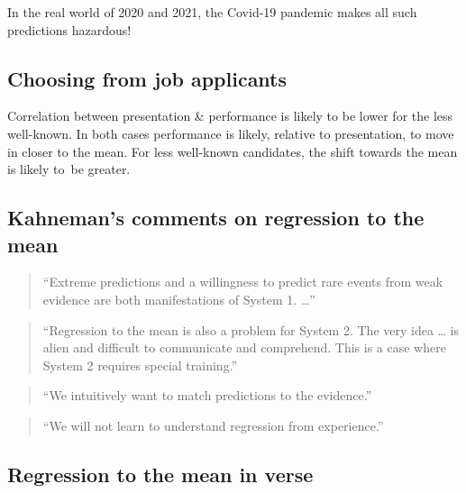 \documentclass[
  10pt,
  b5paper]{book}
\begin{document}
In the real world of 2020 and 2021, the Covid-19 pandemic makes all such predictions hazardous!

\hypertarget{choosing-from-job-applicants}{%
\subsection*{Choosing from job applicants}\label{choosing-from-job-applicants}}

Correlation between presentation \& performance is likely to be lower for the less well-known. In both cases performance is likely, relative to presentation, to move in closer to the mean. For less well-known candidates, the shift towards the mean is likely to~be greater.

\hypertarget{kahnemans-comments-on-regression-to-the-mean}{%
\subsection*{Kahneman's comments on regression to the mean}\label{kahnemans-comments-on-regression-to-the-mean}}

\begin{quote}
``Extreme predictions and a willingness to predict rare events from weak evidence are both manifestations of System 1. \ldots{}''
\end{quote}

\begin{quote}
``Regression to the mean is also a problem for System 2. The very idea \ldots{} is alien and difficult to communicate and comprehend. This is a case where System 2 requires special training.''
\end{quote}

\begin{quote}
``We intuitively want to match predictions to the evidence.''
\end{quote}

\begin{quote}
``We will not learn to understand regression from experience.''
\end{quote}

\hypertarget{regression-to-the-mean-in-verse}{%
\subsection*{Regression to the mean in verse}\label{regression-to-the-mean-in-verse}}
\end{document}
